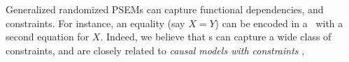 Generalized randomized PSEMs
can capture functional dependencies, and constraints. 
For instance, an equality (say $X = Y$) 
can be encoded in a
\GRPSEM\
with a second equation for $X$.
Indeed, we believe that 
\GRPSEM s
can capture a wide class of constraints, 
and are closely related to
\emph{causal models with constraints} \cite{beckers2023causal},
